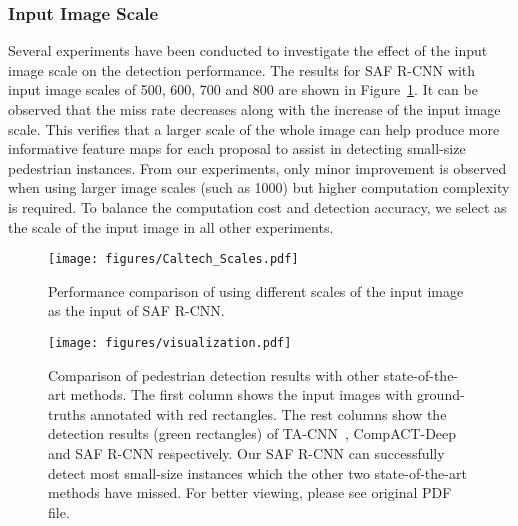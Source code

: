 \documentclass[journal]{IEEEtran}
\begin{document}
\subsubsection{Input Image Scale} 
Several experiments have been conducted to investigate the effect of the input image scale on the detection performance. The results for SAF R-CNN with input image scales of 500, 600, 700 and 800 are shown in  Figure~\ref{fig:Caltech_Scales}. It can be observed that the miss rate decreases along with the increase of the input image scale. This verifies that a larger scale of the whole image can help produce more informative feature maps for each proposal to assist in detecting small-size pedestrian instances. From our experiments, only minor improvement is observed when using larger image scales (such as 1000) but higher computation complexity is required. To balance the computation cost and detection accuracy, we select  as the scale of the input image in all other experiments. 

\begin{figure}
	\begin{center}
		\texttt{[image: figures/Caltech\_Scales.pdf]}
		\caption{{Performance comparison of using different scales of the input image as the input of SAF R-CNN.}}	
		\label{fig:Caltech_Scales}
	\end{center}
	\vspace{-4mm}
\end{figure}

\begin{figure*}
	\begin{center}
		\texttt{[image: figures/visualization.pdf]}
		\caption{{Comparison of pedestrian detection results with other state-of-the-art methods. The first column shows the input images with ground-truths annotated with red rectangles. The rest columns show the detection results (green rectangles) of TA-CNN~\cite{ta_cnn}, CompACT-Deep~\cite{compact} and SAF R-CNN respectively. Our SAF R-CNN can successfully detect most small-size instances which the other two state-of-the-art methods have missed. For better viewing, please see original PDF file.}}	
		\label{fig:visualization}
	\end{center}
	\vspace{-4mm}
\end{figure*}
\end{document}
